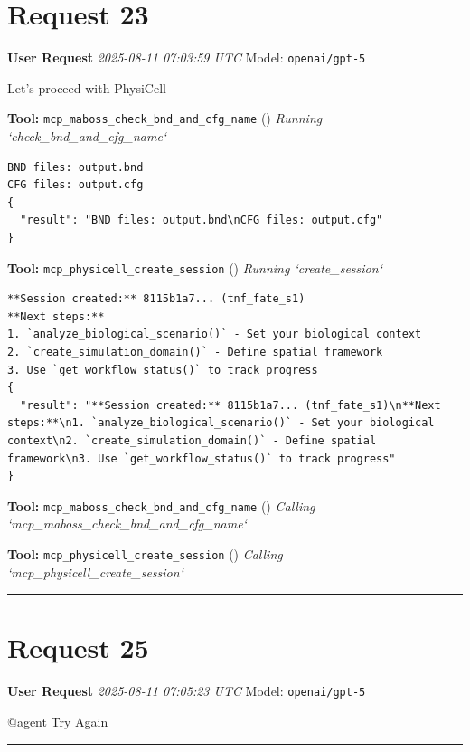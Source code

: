\documentclass[11pt,a4paper]{article}
\begin{document}
\section{Request 23}
\begin{userbox}
\textbf{User Request}
\quad \textit{2025-08-11 07:03:59 UTC}
\quad Model: \texttt{openai/gpt-5}

Let's proceed with PhysiCell

\end{userbox}
\begin{toolokbox}
\textbf{Tool:} \texttt{mcp\_maboss\_check\_bnd\_and\_cfg\_name} (\checkmark)
\textit{Running `check\_bnd\_and\_cfg\_name`}
\begin{lstlisting}
BND files: output.bnd
CFG files: output.cfg
{
  "result": "BND files: output.bnd\nCFG files: output.cfg"
}
\end{lstlisting}
\end{toolokbox}
\begin{toolokbox}
\textbf{Tool:} \texttt{mcp\_physicell\_create\_session} (\checkmark)
\textit{Running `create\_session`}
\begin{lstlisting}
**Session created:** 8115b1a7... (tnf_fate_s1)
**Next steps:**
1. `analyze_biological_scenario()` - Set your biological context
2. `create_simulation_domain()` - Define spatial framework
3. Use `get_workflow_status()` to track progress
{
  "result": "**Session created:** 8115b1a7... (tnf_fate_s1)\n**Next steps:**\n1. `analyze_biological_scenario()` - Set your biological context\n2. `create_simulation_domain()` - Define spatial framework\n3. Use `get_workflow_status()` to track progress"
}
\end{lstlisting}
\end{toolokbox}
\begin{toolokbox}
\textbf{Tool:} \texttt{mcp\_maboss\_check\_bnd\_and\_cfg\_name} (\checkmark)
\textit{Calling `mcp\_maboss\_check\_bnd\_and\_cfg\_name`}
\end{toolokbox}
\begin{toolokbox}
\textbf{Tool:} \texttt{mcp\_physicell\_create\_session} (\checkmark)
\textit{Calling `mcp\_physicell\_create\_session`}
\end{toolokbox}
\bigskip\hrule\bigskip
\section{Request 25}
\begin{userbox}
\textbf{User Request}
\quad \textit{2025-08-11 07:05:23 UTC}
\quad Model: \texttt{openai/gpt-5}

@agent Try Again

\end{userbox}
\bigskip\hrule\bigskip
\end{document}
